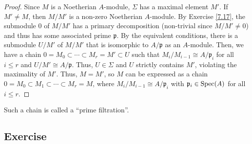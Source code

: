 \begin{proof}
Since $M$ is a Noetherian $A$-module, $\Sigma$ has a maximal element $M'$. If $M' \neq M$, then $M/M'$ is a non-zero Noetherian $A$-module. By Exercise \ref{7.17},
the submodule $0$ of $M/M'$ has a primary decomposition (non-trivial since $M/M' \neq 0$) and thus has some associated prime $\mathfrak{p}$. By the equivalent conditions,
there is a submodule $U/M'$ of $M/M'$ that is isomorphic to $A/\mathfrak{p}$ as an $A$-module. Then, we have a chain
$0 = M_0 \subset \cdots \subset M_r = M' \subset U$
such that $M_i/M_{i-1} \cong A/\mathfrak{p}_i$ for all $i \le r$ and $U/M' \cong A/\mathfrak{p}$. Thus, $U \in \Sigma$ and $U$ strictly contains $M'$, violating the 
maximality of $M'$. Thus, $M = M'$, so $M$ can be expressed as a chain $0 = M_0 \subset M_1 \subset \cdots \subset M_r = M$, where $M_i/M_{i-1} \cong A/\mathfrak{p}_i$
with $\mathfrak{p}_i \in \operatorname{Spec}(A)$ for all $i \le r$. 
\end{proof}

\begin{remark}
Such a chain is called a ``prime filtration''.
\end{remark}

\subsection{Exercise}\label{7.19}

